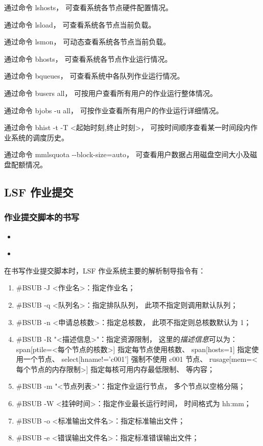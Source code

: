 \documentclass[UTF8]{ctexart}
\newcommand{\mynnote}[1]{\colorbox{gray!15}{\color{blue!65}#1}}
\newcommand{\insertbash}[2]{\begin{itemize}\item[]\end{itemize}}
\begin{document}
通过命令 \mynnote{lshosts}，
可查看系统各节点硬件配置情况。

通过命令 \mynnote{lsload}，
可查看系统各节点当前负载。

通过命令 \mynnote{lsmon}，
可动态查看系统各节点当前负载。

通过命令 \mynnote{bhosts}，
可查看系统各节点作业运行情况。

通过命令 \mynnote{bqueues}，
可查看系统中各队列作业运行情况。

通过命令 \mynnote{busers all}，
可按用户查看所有用户的作业运行整体情况。

通过命令 \mynnote{bjobs -u all}，
可按作业查看所有用户的作业运行详细情况。

通过命令 \mynnote{bhist -t -T <起始时刻,终止时刻>}，
可按时间顺序查看某一时间段内作业系统的调度历史。

通过命令 \mynnote{mmlsquota -{}-block-size=auto}，
可查看用户数据占用磁盘空间大小及磁盘配额情况。

\subsection{LSF 作业提交}
\subsubsection{作业提交脚本的书写}
\insertbash{material/mpi.lsf}{MPI 并行作业提交脚本示例}
\insertbash{material/openmp.lsf}{OpenMP 并行作业提交脚本示例}

在书写作业提交脚本时，LSF 作业系统主要的解析制导指令有：
\begin{enumerate}[\hspace{15mm}（1）]
  \item \mynnote{\#BSUB -J <作业名>}：指定作业名；
  \item \mynnote{\#BSUB -q <队列名>}：指定排队队列，
    此项不指定则调用默认队列；
  \item \mynnote{\#BSUB -n <申请总核数>}：指定总核数，
    此项不指定则总核数默认为 1；
  \item \mynnote{\#BSUB -R "<描述信息>"}：指定资源限制，
    这里的{\em 描述信息}可以为：\newline
    \mynnote{span[ptile=<每个节点的核数>]} 指定每节点使用核数、\newline
    \mynnote{span[hosts=1]} 指定使用一个节点、\newline
    \mynnote{select[hname!='c001']} 强制不使用 c001 节点、\newline
    \mynnote{rusage[mem=<每个节点的内存限制>]} 指定每核可用内存最低限制、\newline
    等内容；
  \item \mynnote{\#BSUB -m "<节点列表>"}：指定作业运行节点，
    多个节点以空格分隔；
  \item \mynnote{\#BSUB -W <挂钟时间>}：指定作业最长运行时间，
    时间格式为 hh:mm；
  \item \mynnote{\#BSUB -o <标准输出文件名>}：指定标准输出文件；
  \item \mynnote{\#BSUB -e <错误输出文件名>}：指定标准错误输出文件；
\end{enumerate}
\end{document}
